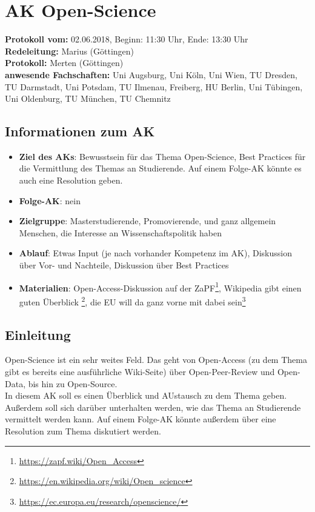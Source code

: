 
\section{AK Open-Science}

  \textbf{Protokoll vom:} 02.06.2018,
  Beginn: 11:30 Uhr,
  Ende: 13:30 Uhr \\
  \textbf{Redeleitung:} Marius (Göttingen) \\
  \textbf{Protokoll:} Merten (Göttingen) \\
  \textbf{anwesende Fachschaften:} Uni Augsburg, Uni Köln, Uni Wien, TU Dresden, TU Darmstadt, Uni Potsdam, TU Ilmenau, Freiberg, HU Berlin, Uni Tübingen, Uni Oldenburg, TU München, TU Chemnitz

  \subsection*{Informationen zum AK}
    \begin{itemize}
      \item \textbf{Ziel des AKs}: Bewusstsein für das Thema Open-Science, Best Practices für die Vermittlung des Themas an Studierende. Auf einem Folge-AK könnte es auch eine Resolution geben.
      \item \textbf{Folge-AK}: nein
      \item \textbf{Zielgruppe}: Masterstudierende, Promovierende, und ganz allgemein Menschen, die Interesse an Wissenschaftspolitik haben
      \item \textbf{Ablauf}: Etwas Input (je nach vorhander Kompetenz im AK), Diskussion über Vor- und Nachteile, Diskussion über Best Practices
      \item \textbf{Materialien}: Open-Access-Diskussion auf der ZaPF\footnote{\url{https://zapf.wiki/Open_Access}}, Wikipedia gibt einen guten Überblick \footnote{\url{https://en.wikipedia.org/wiki/Open_science}}, die EU will da ganz vorne mit dabei sein\footnote{\url{https://ec.europa.eu/research/openscience/}}
    \end{itemize}

  \subsection*{Einleitung}
    Open-Science ist ein sehr weites Feld. Das geht von Open-Access (zu dem Thema gibt es bereits eine ausführliche Wiki-Seite) über Open-Peer-Review und Open-Data, bis hin zu Open-Source. \\
    In diesem AK soll es einen Überblick und AUstausch zu dem Thema geben. Außerdem soll sich darüber unterhalten werden, wie das Thema an Studierende vermittelt werden kann.
    Auf einem Folge-AK könnte außerdem über eine Resolution zum Thema diskutiert werden.

